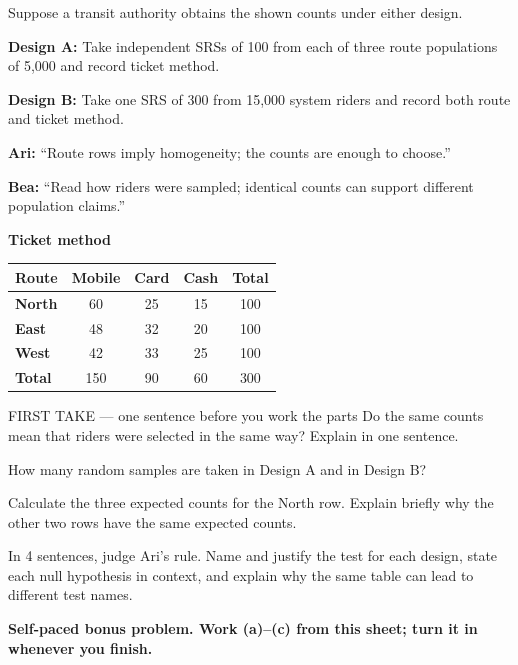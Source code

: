\documentclass[14pt]{extarticle}
\begin{document}
\pagestyle{empty}


\noindent\begin{minipage}[t]{0.57\linewidth}
\vspace{0pt}
Suppose a transit authority obtains the shown counts under either design.\par\smallskip \textbf{Design A:} Take independent SRSs of 100 from each of three route populations of 5,000 and record ticket method.\par \textbf{Design B:} Take one SRS of 300 from 15,000 system riders and record both route and ticket method.\par\smallskip \textbf{Ari:} ``Route rows imply homogeneity; the counts are enough to choose.''\par \textbf{Bea:} ``Read how riders were sampled; identical counts can support different population claims.''\par
\end{minipage}\hfill
\begin{minipage}[t]{0.40\linewidth}
\vspace{0pt}
\begin{center}
\textbf{Ticket method}\par\smallskip
\begin{tabular}{|l|c|c|c|c|}
\hline
\textbf{Route} & \textbf{Mobile} & \textbf{Card} & \textbf{Cash} & \textbf{Total} \\ \hline
\textbf{North} & 60 & 25 & 15 & 100 \\ \hline
\textbf{East} & 48 & 32 & 20 & 100 \\ \hline
\textbf{West} & 42 & 33 & 25 & 100 \\ \hline
\textbf{Total} & 150 & 90 & 60 & 300 \\ \hline
\end{tabular}
\end{center}
\end{minipage}

\begin{firsttakebox}{FIRST TAKE --- one sentence before you work the parts}
Do the same counts mean that riders were selected in the same way? Explain in one sentence.
\end{firsttakebox}

\begin{description}[leftmargin=1.15in, labelwidth=1in, itemsep=2pt, topsep=2pt]
  \item[\dokbadge{1}~(a)] How many random samples are taken in Design A and in Design B?
  \item[\dokbadge{2}~(b)] Calculate the three expected counts for the North row. Explain briefly why the other two rows have the same expected counts.
  \item[\dokbadge{3}~(c)] In 4 sentences, judge Ari's rule. Name and justify the test for each design, state each null hypothesis in context, and explain why the same table can lead to different test names.
\end{description}

\vfill
\textbf{Self-paced bonus problem. Work (a)--(c) from this sheet; turn it in whenever you finish.}
\end{document}
